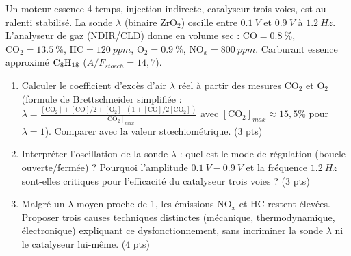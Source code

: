 \documentclass[11pt]{article}
\begin{document}
\begin{exercice}
Un moteur essence 4 temps, injection indirecte, catalyseur trois voies, est au ralenti stabilisé. La sonde $\lambda$ (binaire ZrO$_2$) oscille entre $\SI{0,1}{V}$ et $\SI{0,9}{V}$ à $\SI{1,2}{Hz}$. L'analyseur de gaz (NDIR/CLD) donne en volume sec : $\text{CO} = \SI{0,8}{\%}$, $\text{CO}_2 = \SI{13,5}{\%}$, $\text{HC} = \SI{120}{ppm}$, $\text{O}_2 = \SI{0,9}{\%}$, $\text{NO}_x = \SI{800}{ppm}$. Carburant essence approximé $\ce{C8H18}$ ($A/F_{stoech} = 14,7$).
\begin{enumerate}
    \item Calculer le coefficient d'excès d'air $\lambda$ réel à partir des mesures $\text{CO}_2$ et $\text{O}_2$ (formule de Brettschneider simplifiée : $\lambda = \frac{[\text{CO}_2] + [\text{CO}]/2 + [\text{O}_2] \cdot (1 + [\text{CO}]/2[\text{CO}_2])}{[\text{CO}_2]_{max}}$ avec $[\text{CO}_2]_{max} \approx 15,5\%$ pour $\lambda=1$). Comparer avec la valeur stœchiométrique. (3 pts)
    \item Interpréter l'oscillation de la sonde $\lambda$ : quel est le mode de régulation (boucle ouverte/fermée) ? Pourquoi l'amplitude $\SI{0,1}{V}-\SI{0,9}{V}$ et la fréquence $\SI{1,2}{Hz}$ sont-elles critiques pour l'efficacité du catalyseur trois voies ? (3 pts)
    \item Malgré un $\lambda$ moyen proche de 1, les émissions $\text{NO}_x$ et $\text{HC}$ restent élevées. Proposer trois causes techniques distinctes (mécanique, thermodynamique, électronique) expliquant ce dysfonctionnement, sans incriminer la sonde $\lambda$ ni le catalyseur lui-même. (4 pts)
\end{enumerate}
\end{exercice}
\end{document}
